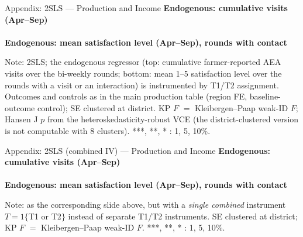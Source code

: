 \documentclass[aspectratio=169]{beamer}
\newcommand{\notefont}{\fontsize{5pt}{6pt}\selectfont}
\begin{document}
\begin{frame}{Appendix: 2SLS --- Production and Income}
	\centering
	{\notefont\textbf{Endogenous: cumulative visits (Apr--Sep)}}\\[1pt]
	\\[4pt]
	{\notefont\textbf{Endogenous: mean satisfaction level (Apr--Sep), rounds with contact}}\\[1pt]
	\begin{minipage}{0.94\textwidth}
		\notefont
		Note: 2SLS; the endogenous regressor (top: cumulative farmer-reported AEA visits
		over the bi-weekly rounds; bottom: mean 1--5 satisfaction level over the rounds with a visit or an interaction) is
		instrumented by T1/T2 assignment. Outcomes and controls as in the main production table
		(region FE, baseline-outcome control); SE clustered at district. KP $F$ $=$
		Kleibergen--Paap weak-ID $F$; Hansen J $p$ from the heteroskedasticity-robust VCE (the
		district-clustered version is not computable with 8 clusters).
		***, **, * : 1, 5, 10\%.
	\end{minipage}
\end{frame}

\begin{frame}{Appendix: 2SLS (combined IV) --- Production and Income}
	\centering
	{\notefont\textbf{Endogenous: cumulative visits (Apr--Sep)}}\\[1pt]
	\\[4pt]
	{\notefont\textbf{Endogenous: mean satisfaction level (Apr--Sep), rounds with contact}}\\[1pt]
	\begin{minipage}{0.94\textwidth}
		\notefont
		Note: as the corresponding slide above, but with a \emph{single combined}
		instrument $T = 1\{$T1 or T2$\}$ instead of separate T1/T2 instruments. SE clustered at
		district; KP $F$ $=$ Kleibergen--Paap weak-ID $F$. ***, **, * : 1, 5, 10\%.
	\end{minipage}
\end{frame}
\end{document}
